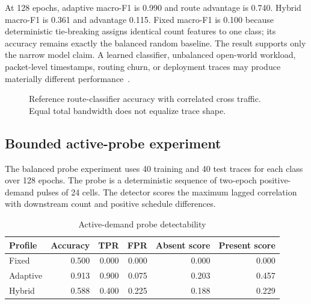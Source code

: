 \documentclass[11pt,oneside]{article}
\begin{document}
At 128 epochs, adaptive macro-F1 is 0.990 and route advantage is 0.740. Hybrid macro-F1 is 0.361 and advantage 0.115. Fixed macro-F1 is 0.100 because deterministic tie-breaking assigns identical count features to one class; its accuracy remains exactly the balanced random baseline. The result supports only the narrow model claim. A learned classifier, unbalanced open-world workload, packet-level timestamps, routing churn, or deployment traces may produce materially different performance~\cite{deepcorr,onlinewf,gtt23,realitycheck2026}.

\begin{figure}[ht]
\centering
{}
\caption{Reference route-classifier accuracy with correlated cross traffic. Equal total bandwidth does not equalize trace shape.}
\label{fig:t3routeaccuracy}
\end{figure}

\subsection{Bounded active-probe experiment}

The balanced probe experiment uses 40 training and 40 test traces for each class over 128 epochs. The probe is a deterministic sequence of two-epoch positive-demand pulses of 24 cells. The detector scores the maximum lagged correlation with downstream count and positive schedule differences.

\begin{table}[ht]
\centering
\caption{Active-demand probe detectability}
\label{tab:t3probe}
\begin{tabular}{@{}lrrrrr@{}}
\toprule
Profile & Accuracy & TPR & FPR & Absent score & Present score \\
\midrule
Fixed & 0.500 & 0.000 & 0.000 & 0.000 & 0.000 \\
Adaptive & 0.913 & 0.900 & 0.075 & 0.203 & 0.457 \\
Hybrid & 0.588 & 0.400 & 0.225 & 0.188 & 0.229 \\
\bottomrule
\end{tabular}
\end{table}
\end{document}
